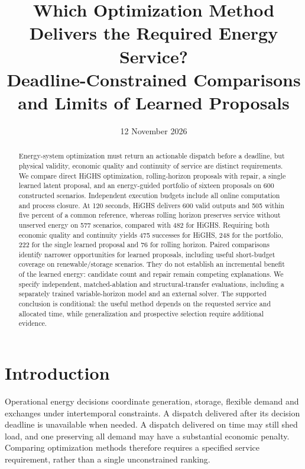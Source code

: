 
\usepackage{tikz}
\setlength{\emergencystretch}{1em}

\usetikzlibrary{arrows.meta,positioning,shapes.geometric,fit,calc}
\date{12 November 2026}
\title{Which Optimization Method Delivers the Required Energy Service?\\
Deadline-Constrained Comparisons and Limits of Learned Proposals}

\maketitle
\begin{abstract}
Energy-system optimization must return an actionable dispatch before a deadline,
but physical validity, economic quality and continuity of service are distinct
requirements. We compare direct HiGHS optimization, rolling-horizon proposals
with repair, a single learned latent proposal, and an energy-guided portfolio
of sixteen proposals on 600 constructed scenarios. Independent execution
budgets include all online computation and process closure. At 120 seconds,
HiGHS delivers 600 valid outputs and 505 within five percent of a common
reference, whereas rolling horizon preserves service without unserved energy
on 577 scenarios, compared with 482 for HiGHS. Requiring both economic quality
and continuity yields 475 successes for HiGHS, 248 for the portfolio, 222 for
the single learned proposal and 76 for rolling horizon. Paired comparisons
identify narrower opportunities for learned proposals, including useful
short-budget coverage on renewable/storage scenarios. They do not establish
an incremental benefit of the learned energy: candidate count and repair
remain competing explanations. We specify independent, matched-ablation and
structural-transfer evaluations, including a separately trained variable-horizon
model and an external solver. \pIIExtensionStatus
The supported conclusion is conditional: the useful method depends
on the requested service and allocated time, while generalization and
prospective selection require additional evidence.
\end{abstract}

\section{Introduction}
Operational energy decisions coordinate generation, storage, flexible demand
and exchanges under intertemporal constraints. A dispatch delivered after its
decision deadline is unavailable when needed. A dispatch delivered on time
may still shed load, and one preserving all demand may have a substantial
economic penalty. Comparing optimization methods therefore requires a
specified service requirement, rather than a single unconstrained ranking.

